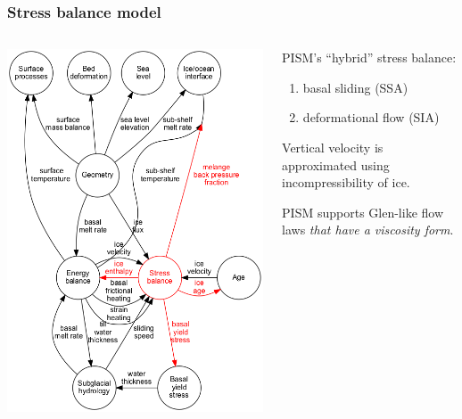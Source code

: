 \documentclass[hide notes,intlimits]{beamer}
\begin{document}
\begin{frame}
  \frametitle{Stress balance model}

  \begin{columns}
    \begin{column}{0.45\linewidth}
\includegraphics[width=\linewidth]{update-3-stress}
    \end{column}
    \begin{column}{0.5\linewidth}
      PISM's ``hybrid'' stress balance:
      \begin{enumerate}
      \item basal sliding (SSA)
      \item deformational flow (SIA)
      \end{enumerate}

      \medskip
      Vertical velocity is approximated using incompressibility of ice.

      \medskip
      PISM supports Glen-like flow laws \emph{that have a viscosity form}.
    \end{column}
  \end{columns}
\end{frame}
\end{document}
